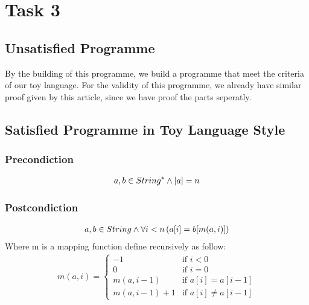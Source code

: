 \documentclass[a4paper,12pt,fleqn]{scrartcl}
\newcommand{\length}[1]{\left|#1\right|}
\begin{document}
\section{Task 3}
\subsection{Unsatisfied Programme}

By the building of this programme, we build a programme that meet the criteria of 
our toy language. For the validity of this programme, we already have similar proof 
given by this article, since we have proof the parts seperatly.
\subsection{Satisfied Programme in Toy Language Style}
\subsubsection{Precondiction}
\begin{gather*}
    a,b\in String^*\And\length{a} = n
\end{gather*}
\subsubsection{Postcondiction}
\begin{gather*}
    a,b\in String \wedge\forall i < n\left(a[i] = b[m(a,i)]\right)
\end{gather*}
Where m is a mapping function define recursively as follow:
\begin{gather*}
    m(a,i) = 
    \begin{cases}
        -1          & \text{if } i<0\\
        0           & \text{if } i=0\\
        m(a,i-1)    & \text{if } a[i] = a[i-1]\\
        m(a,i-1) +1 & \text{if } a[i] \neq a[i-1]
    \end{cases}
\end{gather*}
\end{document}
